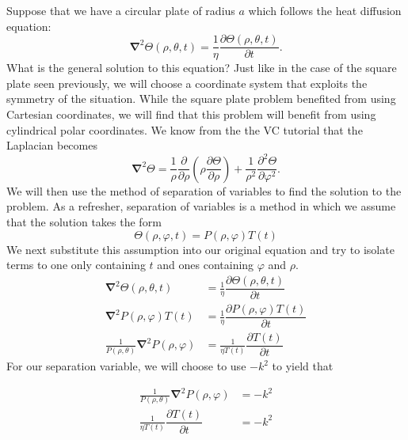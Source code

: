 \documentclass[11pt]{report}
\newcommand{\fdel}[2]{\dfrac{\partial{#1}}{\partial {#2}}} %
\newcommand{\sdel}[2]{\dfrac{\partial^2{#1}}{\partial{#2}^2}} %
\newcommand{\fpar}[1]{\left({#1}\right)}
\newcommand{\del}{\pmb{\nabla}}
\begin{document}

Suppose that we have a circular plate of radius $a$ which follows the heat diffusion equation:
    \begin{equation*}
        \del^2\Theta(\rho,\theta,t)=\frac{1}{\eta}\fdel{\Theta\fpar{\rho,\theta,t}}{t} .
    \end{equation*}
What is the general solution to this equation? Just like in the case of the square plate seen previously, we will choose a coordinate system that exploits the symmetry of the situation. While the square plate problem benefited from using Cartesian coordinates, we will find that this problem will benefit from using cylindrical polar coordinates. We know from the the VC tutorial that the Laplacian becomes
    \begin{equation*}
        \del^2\Theta = \frac{1}{\rho}\fdel{}{\rho}\fpar{\rho\fdel{\Theta}{\rho}}+\frac{1}{\rho^2}\sdel{\Theta}{\varphi}.
    \end{equation*}
We will then use the method of separation of variables to find the solution to the problem. As a refresher, separation of variables is a method in which we assume that the solution takes the form
    \begin{equation*}
        \Theta(\rho,\varphi,t) = P\fpar{\rho,\varphi}T(t) %
    \end{equation*}
We next substitute this assumption into our original equation and try to isolate terms to one only containing $t$ and ones containing $\varphi$ and $\rho$. 
\begin{align*}
     \del^2\Theta(\rho,\theta,t) &= \frac{1}{\eta}\fdel{\Theta\fpar{\rho,\theta,t}}{t}   \\
     \del^2P\fpar{\rho,\varphi}T(t) &= \frac{1}{\eta}\fdel{P\fpar{\rho,\varphi}T(t)}{t} \\
     \frac{1}{P\fpar{\rho,\theta}}\del^2P\fpar{\rho,\varphi} &= \frac{1}{\eta T(t)}\fdel{T(t)}{t} 
\end{align*}
For our separation variable, we will choose to use $-k^2$ to yield that

\begin{align*}
    \frac{1}{P\fpar{\rho,\theta}}\del^2P\fpar{\rho,\varphi} &= -k^2
    \\
    \frac{1}{\eta T(t)}\fdel{T(t)}{t}  &= -k^2
\end{align*}
  
\end{document}
